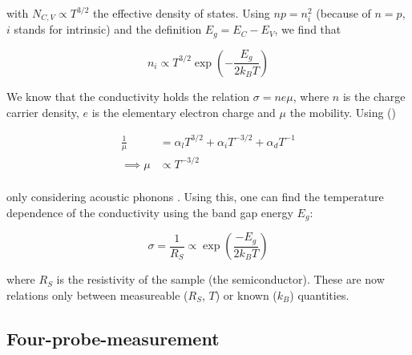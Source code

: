 \documentclass[a4paper]{article}
\begin{document}
with $N_{C,V} \propto T^{3/2}$ the effective density of states. Using $n p = n_i^2$ (because of $n=p$, $i$ stands for intrinsic) and the definition $E_g = E_C - E_V$, we find that 

\begin{equation}
n_i \propto T^{3/2} \exp{\left( -\frac{E_g}{2 k_B T} \right)} \label{eq:ni}
\end{equation}

We know that the conductivity holds the relation $\sigma = n e \mu$, where $n$ is the charge carrier density, $e$ is the elementary electron charge and $\mu$ the mobility. Using (\cite{seitz1952})

\begin{subequations}
\begin{align}
\frac{1}{\mu} &= \alpha_l T^{3/2} + \alpha_i T^{-3/2} + \alpha_d T^{-1} \label{eq:seitz} \\
\implies \mu &\propto T^{-3/2} \label{eq:mu} \\
\end{align}
\end{subequations}

only considering acoustic phonons \cite{esslin2018}. Using this, one can find the temperature dependence of the conductivity using the band gap energy $E_g$:

\begin{equation}
\sigma = \frac{1}{R_S} \propto \exp{\left( \frac{- E_{g}}{2 k_B T} \right)} \label{eq:conductivity}
\end{equation}

where $R_S$ is the resistivity of the sample (the semiconductor). These are now relations only between measureable ($R_S$, $T$) or known ($k_B$) quantities.

\subsection{Four-probe-measurement}
\label{sec:fpm}
\end{document}
